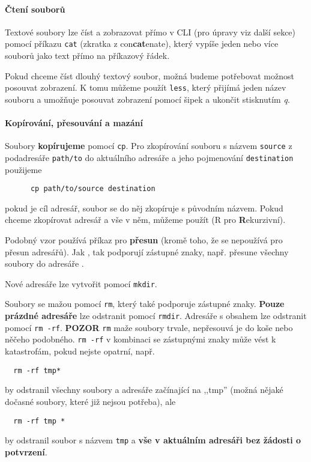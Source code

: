 \paragraph{Čtení souborů}
Textové soubory lze číst a zobrazovat přímo v CLI (pro úpravy viz další sekce) pomocí příkazu \verb|cat| (zkratka z con\textbf{cat}enate), který vypíše jeden nebo více souborů jako text přímo na příkazový řádek.

Pokud chceme číst dlouhý textový soubor, možná budeme potřebovat možnost posouvat zobrazení. K tomu můžeme použít \verb|less|, který přijímá jeden název souboru a umožňuje posouvat zobrazení pomocí šipek a ukončit stisknutím \emph{q}.

\paragraph{Kopírování, přesouvání a mazání}
Soubory \textbf{kopírujeme} pomocí \verb|cp|. Pro zkopírování souboru s názvem \verb|source| z podadresáře \verb|path/to| do aktuálního adresáře a jeho pojmenování \verb|destination| použijeme
\begin{verbatim}
      cp path/to/source destination
\end{verbatim}
pokud je cíl adresář, soubor se do něj zkopíruje s původním názvem. Pokud chceme zkopírovat adresář a vše v něm, můžeme použít  (R pro \textbf{R}ekurzivní).

Podobný vzor používá příkaz pro \textbf{přesun}  (kromě toho, že  se nepoužívá pro přesun adresářů). Jak , tak  podporují zástupné znaky, např.  přesune všechny soubory  do adresáře .

Nové adresáře lze vytvořit pomocí \verb|mkdir|.

Soubory se mažou pomocí \verb|rm|, který také podporuje zástupné znaky. \textbf{Pouze prázdné adresáře} lze odstranit pomocí \verb|rmdir|. Adresáře s obsahem lze odstranit pomocí \verb|rm -rf|. \textbf{POZOR} \verb|rm| maže soubory trvale, nepřesouvá je do koše nebo něčeho podobného. \verb|rm -rf| v kombinaci se zástupnými znaky může vést k katastrofám, pokud nejste opatrní, např.
\begin{verbatim}
  rm -rf tmp*
\end{verbatim}
  by odstranil všechny soubory a adresáře začínající na ,,tmp'' (možná nějaké dočasné soubory, které již nejsou potřeba), ale
\begin{verbatim}
  rm -rf tmp *
\end{verbatim}
  by odstranil soubor s názvem \verb|tmp| a \textbf{vše v aktuálním adresáři bez žádosti o potvrzení}.

